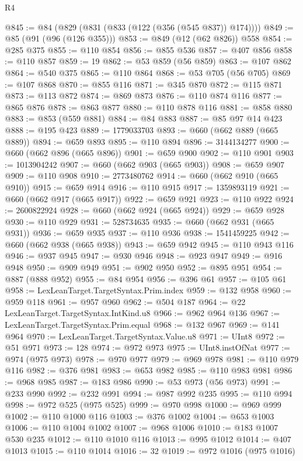 \begin{lexlean}{R4}
\begin{coremodule}
@845 := @84 (@829 (@831 (@833 (@122 (@356 (@545 @837)) @174))))
@849 := @85 (@91 (@96 (@126 @355)))
@853 := @849 (@12 (@62 @826)) @558
@854 := @285 @375
@855 := @110 @854
@856 := @855 @536
@857 := @407 @856
@858 := @110 @857
@859 := 19
@862 := @53 @859 (@56 @859)
@863 := @107 @862
@864 := @540 @375
@865 := @110 @864
@868 := @53 @705 (@56 @705)
@869 := @107 @868
@870 := @855 @116
@871 := @345 @870
@872 := @115 @871
@873 := @113 @872
@874 := @869 @873
@876 := @110 @874 @116
@877 := @865 @876
@878 := @863 @877
@880 := @110 @878 @116
@881 := @858 @880
@883 := @853 (@559 @881)
@884 := @84 @883
@887 := @85 @97 @14 @423
@888 := @195 @423
@889 := 1779033703
@893 := @660 (@662 @889 (@665 @889))
@894 := @659 @893
@895 := @110 @894
@896 := 3144134277
@900 := @660 (@662 @896 (@665 @896))
@901 := @659 @900
@902 := @110 @901
@903 := 1013904242
@907 := @660 (@662 @903 (@665 @903))
@908 := @659 @907
@909 := @110 @908
@910 := 2773480762
@914 := @660 (@662 @910 (@665 @910))
@915 := @659 @914
@916 := @110 @915
@917 := 1359893119
@921 := @660 (@662 @917 (@665 @917))
@922 := @659 @921
@923 := @110 @922
@924 := 2600822924
@928 := @660 (@662 @924 (@665 @924))
@929 := @659 @928
@930 := @110 @929
@931 := 528734635
@935 := @660 (@662 @931 (@665 @931))
@936 := @659 @935
@937 := @110 @936
@938 := 1541459225
@942 := @660 (@662 @938 (@665 @938))
@943 := @659 @942
@945 := @110 @943 @116
@946 := @937 @945
@947 := @930 @946
@948 := @923 @947
@949 := @916 @948
@950 := @909 @949
@951 := @902 @950
@952 := @895 @951
@954 := @887 (@888 @952)
@955 := @84 @954
@956 := @396 @61
@957 := @105 @61
@958 := LexLeanTarget.TargetSyntax.Prim.index
@959 := @132 @958
@960 := @959 @118
@961 := @957 @960
@962 := @504 @187
@964 := @22 LexLeanTarget.TargetSyntax.IntKind.u8
@966 := @962 @964 @136
@967 := LexLeanTarget.TargetSyntax.Prim.equal
@968 := @132 @967
@969 := @141 @964
@970 := LexLeanTarget.TargetSyntax.Value.u8
@971 := UInt8
@972 := @51 @971
@973 := 128
@974 := @972 @973
@975 := UInt8.instOfNat
@977 := @974 (@975 @973)
@978 := @970 @977
@979 := @969 @978
@981 := @110 @979 @116
@982 := @376 @981
@983 := @653 @982
@985 := @110 @983 @981
@986 := @968 @985
@987 := @183 @986
@990 := @53 @973 (@56 @973)
@991 := @233 @990
@992 := @232 @991
@994 := @987 @992 @235
@995 := @110 @994
@998 := @972 @525 (@975 @525)
@999 := @970 @998
@1000 := @969 @999
@1002 := @110 @1000 @116
@1003 := @376 @1002
@1004 := @653 @1003
@1006 := @110 @1004 @1002
@1007 := @968 @1006
@1010 := @183 @1007 @530 @235
@1012 := @110 @1010 @116
@1013 := @995 @1012
@1014 := @407 @1013
@1015 := @110 @1014
@1016 := 32
@1019 := @972 @1016 (@975 @1016)

\end{coremodule}
\end{lexlean}
